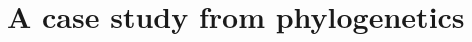 \documentclass[12pt]{article}
\begin{document}

\section*{A case study from phylogenetics}
\label{sec:case}
\end{document}
